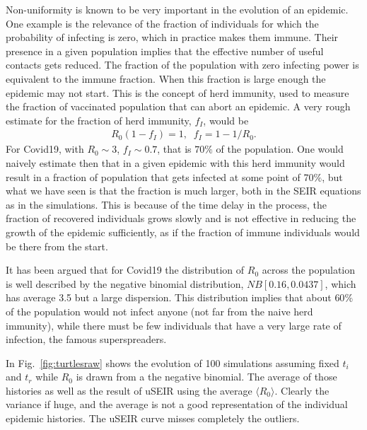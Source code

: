 \documentclass[a4paper,oneside,11pt]{article}
\begin{document}
Non-uniformity is known to be very important in the evolution of an epidemic. One example is the relevance of the fraction of individuals for which the probability of infecting is zero, which in practice makes them immune. Their presence in a given population implies that the effective number of useful contacts gets reduced. The fraction of the population with zero infecting power is equivalent to the immune fraction. When this fraction is large enough  the epidemic may not start. This is the concept of herd immunity, used to measure the fraction of vaccinated population that can abort an epidemic. A very rough estimate for the fraction of herd immunity, $f_I$, would be
   \begin{eqnarray}
  R_0 (1- f_I)  =1, \;\; f_I= 1-1/R_0.
   \end{eqnarray}
   For Covid19, with $R_0 \sim 3$, $f_I \sim 0.7$, that is $70\%$ of the population. One would naively estimate then that in a given epidemic with this herd immunity would result in a
 fraction of  population that gets infected at some point of 70$\%$, but what we have seen is that the fraction is much larger, both in the SEIR equations as in the simulations. This is because of the time delay in the process, the fraction of recovered individuals grows slowly and is not effective in reducing the growth of the epidemic sufficiently, as if the fraction of immune individuals would be there from the start.

  It has been argued that for Covid19 the distribution of $R_0$ across the population is well described by the negative binomial distribution, $NB[0.16,0.0437]$, which has average 3.5 but a large dispersion. This distribution implies that about $60\%$ of the population would not infect anyone (not far from the naive herd immunity), while there must be few individuals that have a very large rate of infection, the famous superspreaders.

  In Fig.~\ref{fig:turtlesraw} shows the evolution of 100 simulations assuming fixed $t_i$ and $t_r$ while $R_0$ is drawn from a the negative binomial. The average of those histories as well as the result of
  uSEIR using the average $\langle R_0\rangle$. Clearly the variance if huge, and the average is not a good representation of the individual epidemic histories. The uSEIR curve misses completely the outliers.
\end{document}
